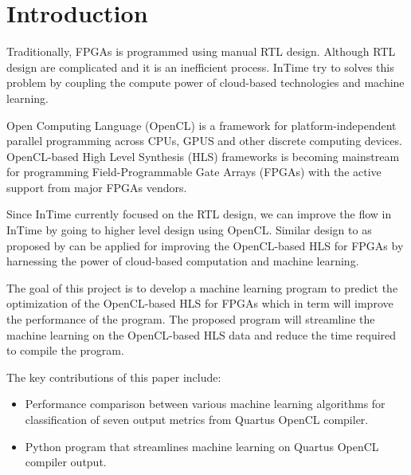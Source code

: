 \chapter{Introduction}
Traditionally, FPGAs is programmed using manual RTL design. Although RTL design are complicated and it is an inefficient process. InTime \citep{kapre2015intime} try to solves this problem by coupling the compute power of cloud-based technologies and machine learning.   

Open Computing Language (OpenCL) \citep{opencl} is a framework for platform-independent parallel programming across CPUs, GPUS and other discrete computing devices. OpenCL-based High Level Synthesis (HLS) frameworks is becoming mainstream for programming Field-Programmable Gate Arrays (FPGAs) with the active support from major FPGAs vendors. \citep{rich2015how}

Since InTime \citep{kapre2015intime} currently focused on the RTL design, we can improve the flow in InTime by going to higher level design using OpenCL. Similar design to as proposed by \cite{kapre2015driving} can be applied for improving the OpenCL-based HLS for FPGAs by harnessing the power of cloud-based computation and machine learning.

The goal of this project is to develop a machine learning program to predict the optimization of the OpenCL-based HLS for FPGAs which in term will improve the performance of the program. The proposed program will streamline the machine learning on the OpenCL-based HLS data and reduce the time required to compile the program.

The key contributions of this paper include:
\begin{itemize}
    \item Performance comparison between various machine learning algorithms for classification of seven output metrics from Quartus OpenCL compiler.
    \item Python program that streamlines machine learning on Quartus OpenCL compiler output.
\end{itemize}
